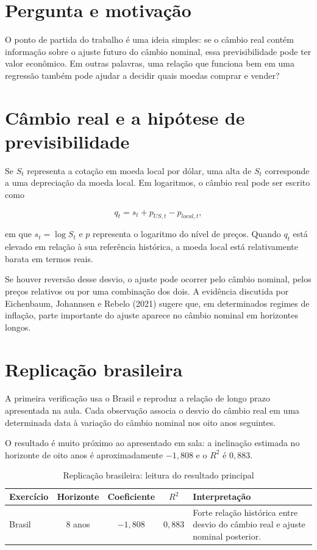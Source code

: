 \documentclass[11pt,a4paper]{article}
\begin{document}
\section{Pergunta e motivação}

O ponto de partida do trabalho é uma ideia simples: se o câmbio real contém informação sobre o ajuste futuro do câmbio nominal, essa previsibilidade pode ter valor econômico. Em outras palavras, uma relação que funciona bem em uma regressão também pode ajudar a decidir quais moedas comprar e vender?

\section{Câmbio real e a hipótese de previsibilidade}

Se $S_t$ representa a cotação em moeda local por dólar, uma alta de $S_t$ corresponde a uma depreciação da moeda local. Em logaritmos, o câmbio real pode ser escrito como

\begin{equation}
q_t = s_t + p_{US,t} - p_{local,t},
\end{equation}

em que $s_t=\log S_t$ e $p$ representa o logaritmo do nível de preços. Quando $q_t$ está elevado em relação à sua referência histórica, a moeda local está relativamente barata em termos reais.

Se houver reversão desse desvio, o ajuste pode ocorrer pelo câmbio nominal, pelos preços relativos ou por uma combinação dos dois. A evidência discutida por Eichenbaum, Johannsen e Rebelo (2021) sugere que, em determinados regimes de inflação, parte importante do ajuste aparece no câmbio nominal em horizontes longos.

\section{Replicação brasileira}

A primeira verificação usa o Brasil e reproduz a relação de longo prazo apresentada na aula. Cada observação associa o desvio do câmbio real em uma determinada data à variação do câmbio nominal nos oito anos seguintes.

O resultado é muito próximo ao apresentado em sala: a inclinação estimada no horizonte de oito anos é aproximadamente $-1{,}808$ e o $R^2$ é $0{,}883$.

\begin{table}[htbp]
\centering
\caption{Replicação brasileira: leitura do resultado principal}
\begin{tabular}{p{3.1cm}ccc p{5.5cm}}
\toprule
\textbf{Exercício} & \textbf{Horizonte} & \textbf{Coeficiente} & \textbf{$R^2$} & \textbf{Interpretação} \\
\midrule
Brasil & 8 anos & $-1{,}808$ & $0{,}883$ & Forte relação histórica entre desvio do câmbio real e ajuste nominal posterior. \\
\bottomrule
\end{tabular}
\end{table}
\end{document}
